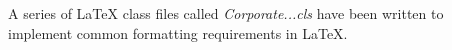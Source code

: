 A series of LaTeX class files called \emph{Corporate...cls} have been written to implement common formatting requirements in LaTeX.